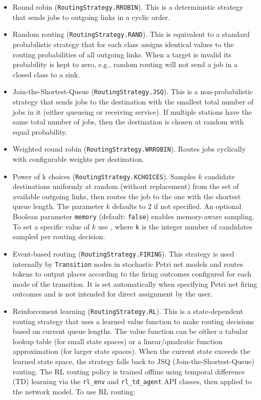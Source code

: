 \begin{itemize}
\item Round robin (\texttt{RoutingStrategy.RROBIN}). This is a deterministic strategy that sends jobs to outgoing links in a cyclic order. %
\item Random routing (\texttt{RoutingStrategy.RAND}). This is equivalent to a standard probabilistic strategy that for each class assigns identical values to the routing probabilities of all outgoing links. When a target is invalid its probability is kept to zero, e.g., random routing will not send a job in a closed class to a sink.
\item Join-the-Shortest-Queue (\texttt{RoutingStrategy.JSQ}).  This is a non-probabilistic strategy that sends jobs to the destination with the smallest total number of jobs in it (either queueing or receiving service). If multiple stations have the same total number of jobs, then the destination is chosen at random with equal probability.
\item Weighted round robin (\texttt{RoutingStrategy.WRROBIN}). Routes jobs cyclically with configurable weights per destination.
\item Power of k choices (\texttt{RoutingStrategy.KCHOICES}). Samples $k$ candidate destinations uniformly at random (without replacement) from the set of available outgoing links, then routes the job to the one with the shortest queue length. The parameter $k$ defaults to $2$ if not specified. An optional Boolean parameter \texttt{memory} (default: \texttt{false}) enables memory-aware sampling. To set a specific value of $k$ use , where \texttt{k} is the integer number of candidates sampled per routing decision.
\item Event-based routing (\texttt{RoutingStrategy.FIRING}). This strategy is used internally by \texttt{Transition} nodes in stochastic Petri net models and routes tokens to output places according to the firing outcomes configured for each mode of the transition. It is set automatically when specifying Petri net firing outcomes and is not intended for direct assignment by the user.
\item Reinforcement learning (\texttt{RoutingStrategy.RL}). This is a state-dependent routing strategy that uses a learned value function to make routing decisions based on current queue lengths. The value function can be either a tabular lookup table (for small state spaces) or a linear/quadratic function approximation (for larger state spaces). When the current state exceeds the learned state space, the strategy falls back to JSQ (Join-the-Shortest-Queue) routing. The RL routing policy is trained offline using temporal difference (TD) learning via the \texttt{rl\_env} and \texttt{rl\_td\_agent} API classes, then applied to the network model. To use RL routing:

\end{itemize}
